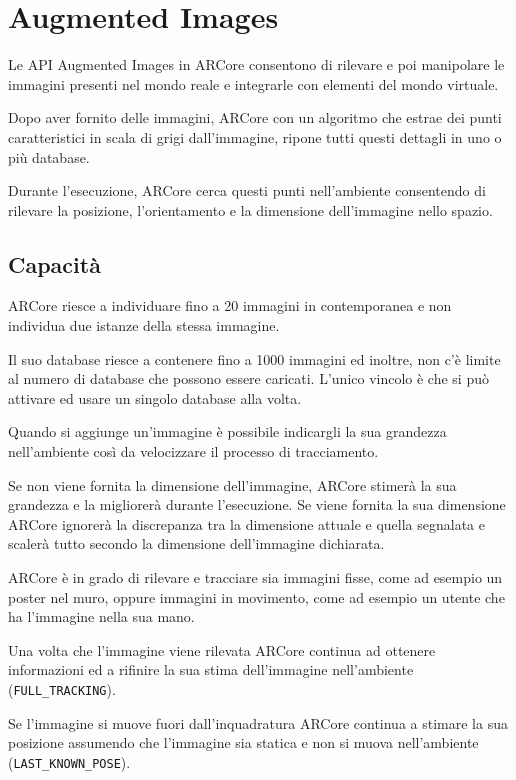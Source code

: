 \documentclass[crop=false, class=book]{standalone}
\begin{document}
	\chapter{Augmented Images}
	
	
	Le API Augmented Images in ARCore consentono di rilevare e poi manipolare le immagini presenti nel mondo reale e integrarle con elementi del mondo virtuale.
	
	Dopo aver fornito delle immagini, ARCore con un algoritmo che estrae dei punti caratteristici in scala di grigi dall’immagine, ripone tutti questi dettagli in uno o più database.
	
	Durante l’esecuzione, ARCore cerca questi punti nell’ambiente consentendo di rilevare la posizione, l’orientamento e la dimensione dell’immagine nello spazio.

	\section{Capacità}
	ARCore riesce a individuare fino a 20 immagini in contemporanea e non individua due istanze della stessa immagine.
	
	Il suo database riesce a contenere fino a 1000 immagini ed inoltre, non c’è limite al numero di database che possono essere caricati. L’unico vincolo è che si può attivare ed usare un singolo database alla volta.
	
	Quando si aggiunge un’immagine è possibile indicargli la sua grandezza nell’ambiente così da velocizzare il processo di tracciamento.
	
	Se non viene fornita la dimensione dell’immagine, ARCore stimerà la sua grandezza e la migliorerà durante l’esecuzione. Se viene fornita la sua dimensione ARCore ignorerà la discrepanza tra la dimensione attuale e quella segnalata e scalerà tutto secondo la dimensione dell’immagine dichiarata.
	
	ARCore è in grado di rilevare e tracciare sia immagini fisse, come ad esempio un poster nel muro, oppure immagini in movimento, come ad esempio un utente che ha l’immagine nella sua mano.
	
	Una volta che l’immagine viene rilevata ARCore continua ad ottenere informazioni ed a rifinire la sua stima dell’immagine nell’ambiente (\verb|FULL_TRACKING|).
	
	Se l’immagine si muove fuori dall’inquadratura ARCore continua a stimare la sua posizione assumendo che l’immagine sia statica e non si muova nell’ambiente (\verb|LAST_KNOWN_POSE|).
\end{document}
